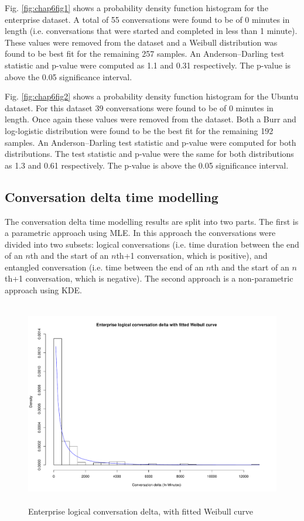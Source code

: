 Fig. \ref{fig:chap6fig1} shows a probability density function histogram for the enterprise dataset. A total of 55 conversations were found to be of 0 minutes in length (i.e. conversations that were started and completed in less than 1 minute). These values were removed from the dataset and a Weibull distribution was found to be best fit for the remaining 257 samples. An Anderson--Darling test statistic and p-value were computed as 1.1 and 0.31 respectively. The p-value is above the 0.05 significance interval. 

Fig. \ref{fig:chap6fig2} shows a probability density function histogram for the Ubuntu dataset. For this dataset 39 conversations were found to be of 0 minutes in length. Once again these values were removed from the dataset. Both a Burr and log-logistic distribution were found to be the best fit for the remaining 192 samples. An Anderson--Darling test statistic and p-value were computed for both distributions. The test statistic and p-value were the same for both distributions as 1.3 and 0.61 respectively. The p-value is above the 0.05 significance interval.

\subsection{Conversation delta time modelling}

The conversation delta time modelling results are split into two parts. The first is a parametric approach using MLE. In this approach the conversations were divided into two subsets: logical conversations (i.e. time duration between the end of an $n$th and the start of an $n$th+1 conversation, which is positive), and entangled conversation (i.e. time between the end of an $n$th and the start of an $n$th+1 conversation, which is negative). The second approach is a non-parametric approach using KDE.

\begin{figure}
\begin{center}
\caption{Enterprise logical conversation delta, with fitted Weibull curve}
\label{fig:chapt6fig3}
\includegraphics[height=9cm, width=13cm]{graphs/different/03_delta_logical_enterprise.pdf} 
\end{center}
\end{figure}

